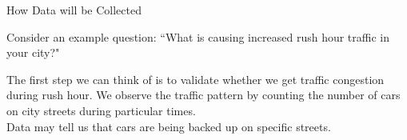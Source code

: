 \documentclass[aspectratio=169,xcolor=dvipsnames,svgnames,x11names,fleqn]{beamer}
\begin{document}

\begin{frame}{How Data will be Collected}

    \begin{gradbox}{}
    \Large  \color{Blue}
        Consider an example question: ``What is causing increased rush hour traffic in your city?"
    \end{gradbox}

    \begin{gradblock}{\quad}
        The first step we can think of is to validate whether we get traffic congestion during rush hour. We observe the traffic pattern by counting the number of cars on city streets during particular times. 
        \\\hspace*{\fill} Data may tell us that cars are being backed up on specific streets.
    \end{gradblock}
\end{frame}
\end{document}
